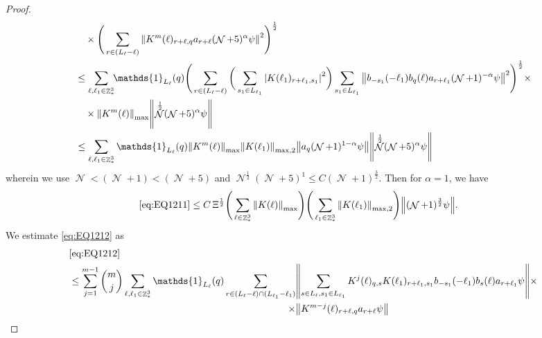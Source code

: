 \documentclass[sn-mathphys, Numbered ,a4paper]{sn-jnl}%
\DeclareMathOperator{\Z}{\mathbb{Z}}
\DeclareMathOperator{\NN}{\mathcal{N}}
\newcommand{\half}{\frac{1}{2}}
\theoremstyle{plain}
\theoremstyle{definition}
\theoremstyle{remark}
\theoremstyle{plain}
\theoremstyle{definition}
\theoremstyle{remark}
\begin{document}
\begin{proof}
\begin{align}
	&\quad \times \Bigg( \sum\limits_{r \in (L_\ell-\ell)}  \norm{  K^{m}(\ell)_{r+\ell,q}  a_{r+\ell} (\NN+5)^{\alpha}\psi }^2\Bigg)^\half \nonumber\\
	&\leq \sum\limits_{\ell,\ell_1 \in \Z^3_*} \!\!\mathds{1}_{L_\ell}(q) \Bigg( \sum\limits_{r \in (L_\ell-\ell)} \bigg( \sum\limits_{s_1 \in L_{\ell_1}}\abs{K(\ell_1)_{r+\ell_1,s_1}}^2\bigg) \sum\limits_{s_1 \in L_{\ell_1}} \norm{ b_{-s_1}(-\ell_1) b_{q}(\ell) a_{r+\ell_1} (\NN+1)^{-\alpha}\psi}^2\Bigg)^\half \times\nonumber\\
	&\quad \times  \norm{  K^{m}(\ell)}_{\mathrm{max}} \norm{ \NN^\half(\NN+5)^{\alpha}\psi } \nonumber\\
	&\leq \sum\limits_{\ell ,\ell_1\in \Z^3_*}\mathds{1}_{L_\ell}(q) \norm{  K^{m}(\ell)}_{\mathrm{max}}   \norm{K(\ell_1)}_{\mathrm{max,2}}  \norm{   a_{q}(\NN+1)^{1-\alpha}\psi} \norm{ \NN^\half (\NN+5)^{\alpha}\psi } \nonumber\\
\end{align}
wherein we use $\NN<(\NN+1)<(\NN+5)$ and $\NN^\half(\NN+5)^1\leq C(\NN+1)^{\frac{3}{2}}$. Then for $\alpha = 1$, we have
\begin{align}
	\eqref{eq:EQ1211}&\leq C\, \Xi^\half \Bigg( \sum\limits_{\ell \in \Z^3_*} \norm{K(\ell)}_{\mathrm{max}} \Bigg) \Bigg( \sum\limits_{\ell_1 \in \Z^3_*}\norm{K(\ell_1)}_{\mathrm{max,2}} \Bigg)  \norm { (\NN+1)^{\frac{3}{2}} \psi }. \label{eq:estEQ1211}    
\end{align}
We estimate \eqref{eq:EQ1212} as 
\begin{alignat}{2}
	&\eqref{eq:EQ1212}\nonumber\\
	&\leq \sum\limits_{j=1}^{m-1} {{m}\choose j} \sum\limits_{\ell, \ell_1\in \Z^3_*} \mathds{1}_{L_{\ell}}(q)\, \begin{aligned}[t]
	\sum\limits_{r\in (L_{\ell}-\ell) \cap (L_{\ell_1}-\ell_1)} &\norm{ \sum\limits_{s \in L_\ell, s_1 \in L_{\ell_1}} K^{j}(\ell)_{q,s} K(\ell_1)_{r+\ell_1,s_1} b_{-s_1}(-\ell_1) b_{s}(\ell) a_{r+\ell_1}\psi}\times\nonumber\\\times&\norm{  K^{m-j}(\ell)_{r+\ell,q} a_{r+\ell} \psi }

\end{aligned}
\end{alignat}
\end{proof}
\end{document}
